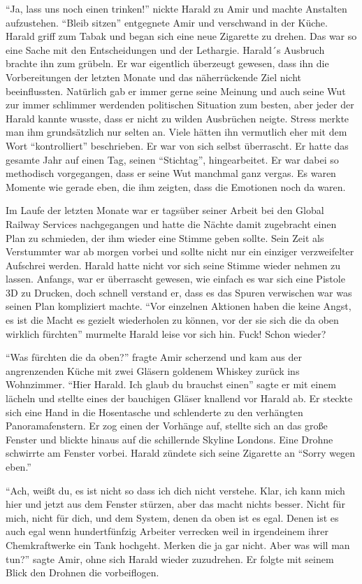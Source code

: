 ``Ja, lass uns noch einen trinken!'' nickte Harald zu Amir und machte Anstalten aufzustehen.
``Bleib sitzen'' entgegnete Amir und verschwand in der Küche.
Harald griff zum Tabak und began sich eine neue Zigarette zu drehen. Das war so eine Sache mit den Entscheidungen und der Lethargie. Harald´s Ausbruch brachte ihn zum grübeln.
Er war eigentlich überzeugt gewesen, dass ihn die Vorbereitungen der letzten Monate und das näherrückende Ziel nicht beeinflussten. Natürlich gab er immer gerne seine Meinung und auch seine Wut zur immer schlimmer werdenden politischen Situation zum besten, aber jeder der Harald kannte wusste, dass er nicht zu wilden Ausbrüchen neigte. Stress merkte man ihm grundsätzlich nur selten an. Viele hätten ihn vermutlich eher mit dem Wort ``kontrolliert'' beschrieben. Er war von sich selbst überrascht. Er hatte das gesamte Jahr auf einen Tag, seinen ``Stichtag'', hingearbeitet. Er war dabei so methodisch vorgegangen, dass er seine Wut manchmal ganz vergas. Es waren Momente wie gerade eben, die ihm zeigten, dass die Emotionen noch da waren.

Im Laufe der letzten Monate war er tagsüber seiner Arbeit bei den Global Railway Services nachgegangen und hatte die Nächte damit zugebracht einen Plan zu schmieden, der ihm wieder eine Stimme geben sollte. Sein Zeit als Verstummter war ab morgen vorbei und sollte nicht nur ein einziger verzweifelter Aufschrei werden. Harald hatte nicht vor sich seine Stimme wieder nehmen zu lassen. Anfangs, war er überrascht gewesen, wie einfach es war sich eine Pistole 3D zu Drucken, doch schnell verstand er, dass es das Spuren verwischen war was seinen Plan kompliziert machte. ``Vor einzelnen Aktionen haben die keine Angst, es ist die Macht es gezielt wiederholen zu können, vor der sie sich die da oben wirklich fürchten” murmelte Harald leise vor sich hin. Fuck! Schon wieder?

``Was fürchten die da oben?'' fragte Amir scherzend und kam aus der angrenzenden Küche mit zwei Gläsern goldenem Whiskey zurück ins Wohnzimmer. ``Hier Harald. Ich glaub du brauchst einen'' sagte er mit einem lächeln und stellte eines der bauchigen Gläser knallend vor Harald ab. Er steckte sich eine Hand in die Hosentasche und schlenderte zu den verhängten Panoramafenstern. Er zog einen der Vorhänge auf, stellte sich an das große Fenster und blickte hinaus auf die schillernde Skyline Londons. Eine Drohne schwirrte am Fenster vorbei. Harald zündete sich seine Zigarette an ``Sorry wegen eben.''

``Ach, weißt du, es ist nicht so dass ich dich nicht verstehe. Klar, ich kann mich hier und jetzt aus dem Fenster stürzen, aber das macht nichts besser. Nicht für mich, nicht für dich, und dem System, denen da oben ist es egal. Denen ist es auch egal wenn hundertfünfzig Arbeiter verrecken weil in irgendeinem ihrer Chemkraftwerke ein Tank hochgeht. Merken die ja gar nicht. Aber was will man tun?'' sagte Amir, ohne sich Harald wieder zuzudrehen. Er folgte mit seinem Blick den Drohnen die vorbeiflogen.

